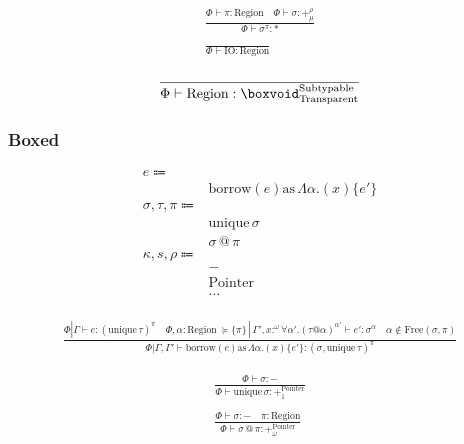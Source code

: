 \documentclass {article}
\begin{document}
\begin{gather*}
\frac
{\Phi \vdash \pi : \text{Region} \quad \Phi \vdash \sigma : +^\rho_\mu}
{\Phi \vdash \sigma^\pi : *} \\
\\
\frac
{}
{\Phi \vdash \text{IO} : \text{Region}}
\end{gather*}

\begin{gather*}
\frac
{}
{\Phi \vdash \text{Region} : \boxvoid^\text{Subtypable}_\text{Transparent}} \\
\end{gather*}

\subsubsection{Boxed}
\begin{align*}
e \Coloneqq & \\
& \text{borrow} (e) \text{as} \, \Lambda \alpha. (x) \{ e' \} \\
\sigma, \tau, \pi \Coloneqq & \\
& \text{unique} \, \sigma \\
& \sigma \, @ \, \pi \\
\kappa, s, \rho \Coloneqq & \\
& - \tag{Boxed} \\
& \text{Pointer} \tag{Pointer Representation} \\
& \dots \\
\end{align*}

\begin{gather*}
\frac
{\Phi | \Gamma \vdash e : (\text{unique} \, \tau)^\pi \quad \Phi,\alpha : \text{Region} \, \succeq \{ \pi \} \, | \, \Gamma', x :^\omega \forall \alpha'. (\tau @ \alpha)^{\alpha'} \vdash e' : \sigma^\alpha \quad \alpha \notin \text{Free}(\sigma, \pi)}
{\Phi | \Gamma, \Gamma' \vdash \text{borrow} (e) \text{as} \, \Lambda \alpha. (x) \{ e' \} : (\sigma, \text{unique} \, \tau)^\pi }
\end{gather*}

\begin{gather*}
\frac
{\Phi \vdash \sigma : -}
{\Phi \vdash \text{unique} \, \sigma : +^\text{Pointer}_1} \\
\\
\frac
{\Phi \vdash \sigma : - \quad \pi : \text{Region}}
{\Phi \vdash \sigma \, @ \, \pi : +^\text{Pointer}_\omega} 
\end{gather*}
\end{document}
